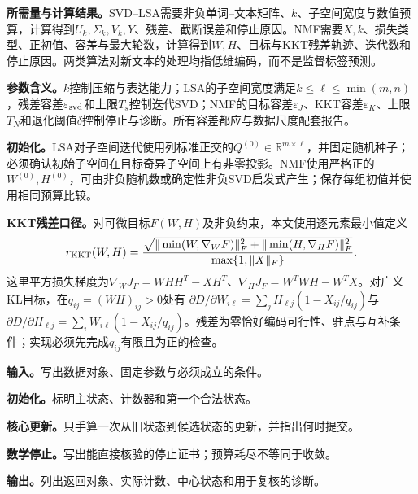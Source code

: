 \label{struct:V4-C05-CH20}
\textbf{所需量与计算结果。}SVD--LSA需要非负单词--文本矩阵、$k$、子空间宽度与数值预算，计算得到$U_k,\Sigma_k,V_k,Y$、残差、截断误差和停止原因。NMF需要$X,k$、损失类型、正初值、容差与最大轮数，计算得到$W,H$、目标与KKT残差轨迹、迭代数和停止原因。两类算法对新文本的处理均指低维编码，而不是监督标签预测。

\label{struct:V4-C05-CH21}
\textbf{参数含义。}$k$控制压缩与表达能力；LSA的子空间宽度满足$k\le\ell\le\min(m,n)$，残差容差$\varepsilon_{\rm svd}$和上限$T_s$控制迭代SVD；NMF的目标容差$\varepsilon_J$、KKT容差$\varepsilon_K$、上限$T_N$和退化阈值$\delta$控制停止与诊断。所有容差都应与数据尺度配套报告。

\label{struct:V4-C05-CH22}
\textbf{初始化。}LSA对子空间迭代使用列标准正交的$Q^{(0)}\in\mathbb R^{m\times\ell}$，并固定随机种子；必须确认初始子空间在目标奇异子空间上有非零投影。NMF使用严格正的$W^{(0)},H^{(0)}$，可由非负随机数或确定性非负SVD启发式产生；保存每组初值并使用相同预算比较。

\textbf{KKT残差口径。}对可微目标$F(W,H)$及非负约束，本文使用逐元素最小值定义
\[
r_{\rm KKT}(W,H)=
\frac{\sqrt{\|\min(W,\nabla_WF)\|_F^2+
\|\min(H,\nabla_HF)\|_F^2}}
{\max\{1,\|X\|_F\}}.
\]
这里平方损失梯度为$\nabla_WJ_F=WHH^T-XH^T$、$\nabla_HJ_F=W^TWH-W^TX$。对广义KL目标，在$q_{ij}=(WH)_{ij}>0$处有
$\partial D/\partial W_{i\ell}=\sum_jH_{\ell j}(1-X_{ij}/q_{ij})$与
$\partial D/\partial H_{\ell j}=\sum_iW_{i\ell}(1-X_{ij}/q_{ij})$。残差为零恰好编码可行性、驻点与互补条件；实现必须先完成$q_{ij}$有限且为正的检查。

\label{struct:V4-C05-CH19}

\begin{keypointbox}[title={基于截断SVD的潜在语义分析：五步阅读}]
\textbf{输入。}写出数据对象、固定参数与必须成立的条件。\par
\textbf{初始化。}标明主状态、计数器和第一个合法状态。\par
\textbf{核心更新。}只手算一次从旧状态到候选状态的更新，并指出何时提交。\par
\textbf{数学停止。}写出能直接核验的停止证书；预算耗尽不等同于收敛。\par
\textbf{输出。}列出返回对象、实际计数、中心状态和用于复核的诊断。
\end{keypointbox}

